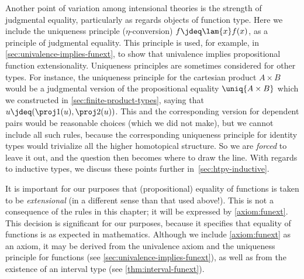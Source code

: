 
Another point of variation among intensional theories is the strength of judgmental equality, particularly as regards objects of function type.  Here we include the uniqueness principle ($\eta$-conversion) $f \jdeq \lam{x} f(x)$, as a principle of judgmental equality.  This principle is used, for example, in \cref{sec:univalence-implies-funext}, to show that univalence implies propositional function extensionality.  Uniqueness principles are sometimes considered for other types.
For instance, the uniqueness principle for the cartesian product $A\times B$ would be a judgmental version of the propositional equality $\uniq{A\times B}$ which we constructed in \cref{sec:finite-product-types}, saying that $u \jdeq (\proj1(u),\proj2(u))$.
This and the corresponding version for dependent pairs would be reasonable choices (which we did not make), but we cannot include all such rules, because the corresponding uniqueness principle for identity types would trivialize all the higher homotopical structure.  So we are \emph{forced} to leave it out, and the question then becomes where to draw the line. With regards to inductive types, we discuss these points further in~\cref{sec:htpy-inductive}.

It is important for our purposes that (propositional) equality of functions is taken to be \emph{extensional} (in a different sense than that used above!).
This is not a consequence of the rules in this chapter; it will be expressed by \cref{axiom:funext}.
%
This decision is significant for our purposes, because it specifies that equality of functions is as expected in mathematics.  Although we include \cref{axiom:funext} as an axiom, it may be derived from the univalence axiom and the uniqueness principle for functions (see \cref{sec:univalence-implies-funext}), as well as from the existence of an interval type (see \cref{thm:interval-funext}).

